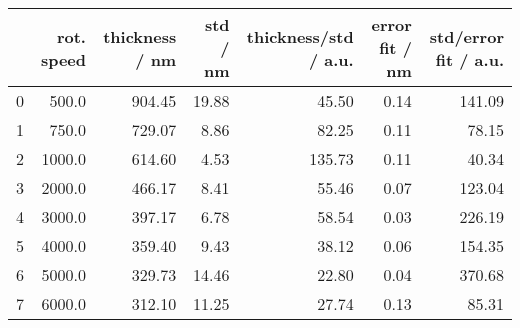\begin{tabular}{lrrrrrr}
\toprule
{} &  rot. speed &  thickness / nm &  std / nm &  thickness/std / a.u. &  error fit / nm &  std/error fit / a.u. \\
\midrule
0 &       500.0 &          904.45 &     19.88 &                 45.50 &            0.14 &                141.09 \\
1 &       750.0 &          729.07 &      8.86 &                 82.25 &            0.11 &                 78.15 \\
2 &      1000.0 &          614.60 &      4.53 &                135.73 &            0.11 &                 40.34 \\
3 &      2000.0 &          466.17 &      8.41 &                 55.46 &            0.07 &                123.04 \\
4 &      3000.0 &          397.17 &      6.78 &                 58.54 &            0.03 &                226.19 \\
5 &      4000.0 &          359.40 &      9.43 &                 38.12 &            0.06 &                154.35 \\
6 &      5000.0 &          329.73 &     14.46 &                 22.80 &            0.04 &                370.68 \\
7 &      6000.0 &          312.10 &     11.25 &                 27.74 &            0.13 &                 85.31 \\
\bottomrule
\end{tabular}

